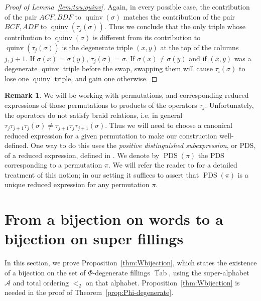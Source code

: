 \documentclass[11pt]{article}
\theoremstyle{definition}
\newtheorem{remark}[theo]{Remark}
\numberwithin{equation}{section}
\DeclareMathOperator{\PQT}{Tab}
\DeclareMathOperator{\PDS}{PDS}
\DeclareMathOperator{\quinv}{quinv}
\begin{document}
\begin{proof}[Proof of Lemma~\ref{lem:tau:quinv}]
\medskip
Again, in every possible case, the contribution of the pair $ACF, BDF$ to $\quinv(\sigma)$ matches the contribution of the pair $BCF, ADF$ to $\quinv(\tau_j(\sigma))$. Thus we conclude that the only triple whose contribution to $\quinv(\sigma)$ is different from its contribution to $\quinv(\tau_j(\sigma))$ is the degenerate triple $(x,y)$ at the top of the columns $j,j+1$. If $\sigma(x)=\sigma(y)$, $\tau_j(\sigma)=\sigma$. If $\sigma(x)\neq \sigma(y)$ and if $(x,y)$ was a degenerate $\quinv$ triple before the swap, swapping them will cause $\tau_i(\sigma)$ to lose one $\quinv$ triple, and gain one otherwise. 
\end{proof}

\begin{remark}\label{rem:PDS}
We will be working with permutations, and corresponding reduced expressions of those permutations to products of the operators $\tau_j$. Unfortunately, the operators do not satisfy braid relations, i.e. in general $\tau_j\tau_{j+1}\tau_j(\sigma) \neq \tau_{j+1}\tau_j\allowbreak \tau_{j+1}(\sigma)$. Thus we will need to choose a canonical reduced expression for a given permutation to make our construction well-defined. One way to do this uses the \emph{positive distinguished subexpression}, or PDS, of a reduced expression, defined in \cite{MarshRietsch}. We denote by $\PDS(\pi)$ the PDS corresponding to a permutation $\pi$. We will refer the reader to \cite[Section 3]{compactformula} for a detailed treatment of this notion; in our setting it suffices to assert that $\PDS(\pi)$ is a unique reduced expression for any permutation $\pi$.
\end{remark} 

\section{From a bijection on words to a bijection on 
super fillings}
\label{sec:bijPQT}

In this section, we prove Proposition~\ref{thm:Wbijection}, which states the existence of a bijection on the set of $\Phi$-degenerate fillings $\widetilde{\PQT}$, using the super-alphabet $\mathcal{A}$ and total ordering $<_2$ on that alphabet. Proposition~\ref{thm:Wbijection} is needed in the proof of Theorem~\ref{prop:Phi-degenerate}.
\end{document}
